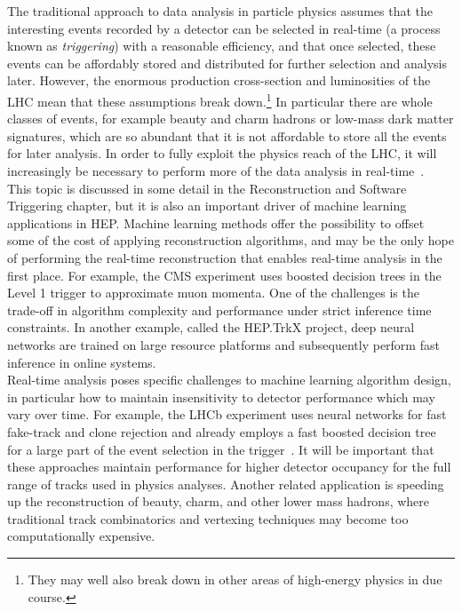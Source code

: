 The traditional approach to data analysis in particle physics assumes that the interesting events recorded by a detector can be selected in real-time (a process known as \emph{triggering}) with a reasonable efficiency, and that once selected, these events can be affordably stored and distributed for further selection and analysis later.
However, the enormous production cross-section and luminosities of the LHC mean that these assumptions break down.\footnote{They may well also break down in other areas of high-energy physics in due course.}
In particular there are whole classes of events, for example beauty and charm hadrons or low-mass dark matter signatures, which are so abundant that it is not affordable to store all the events for later analysis. In order to fully exploit the physics reach of the LHC, it will increasingly be necessary to perform more of the data analysis in real-time~\cite{1742-6596-664-8-082004}.\\

This topic is discussed in some detail in the Reconstruction and Software Triggering chapter, but it is also an important driver of machine learning applications in HEP. Machine learning methods offer the possibility to offset some of the cost of applying reconstruction algorithms, and may be the only hope of performing the real-time reconstruction that enables real-time analysis in the first place. For example, the CMS experiment uses boosted decision trees in the Level 1 trigger to approximate muon momenta. One of the challenges is the trade-off in algorithm complexity and performance under strict inference time constraints. In another example, called the HEP.TrkX project, deep neural networks are trained on large resource platforms and subsequently perform fast inference in online systems.\\

Real-time analysis poses specific challenges to machine learning algorithm design, in particular how to maintain insensitivity to detector performance which may vary over time. For example, the LHCb experiment uses neural networks for fast fake-track and clone rejection and already employs a fast boosted decision tree for a large part of the event selection in the trigger~\cite{Gligorov:2012qt}. It will be important that these approaches maintain performance for higher detector occupancy for the full range of tracks used in physics analyses. Another related application is speeding up the reconstruction of beauty, charm, and other lower mass hadrons, where traditional track combinatorics and vertexing techniques may become too computationally expensive.\\

